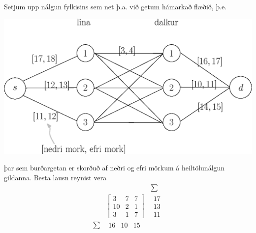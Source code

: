 \begin{lausn}Setjum upp nálgun fylkisins sem net þ.a. við getum hámarkað flæðið, þ.e.
 \begin{center}
\includegraphics[width=0.75\columnwidth]{figs/maxflow_matrix.eps}
\end{center}
þar sem burðargetan er skorðuð af neðri og efri mörkum á heiltölunálgun gildanna. Besta lausn reynist vera 
\[\begin{array}{ccc}
& & \sum \\
&\begin{bmatrix}
   3 & 7 & 7 \\
   10 & 2 & 1 \\
   3 & 1 & 7 
 \end{bmatrix} & \begin{matrix} 17  \\ 13 \\ 11\end{matrix} \\ 
\sum & \begin{matrix} 16 & 10 & 15\end{matrix}
\end{array}\]
\end{lausn}

